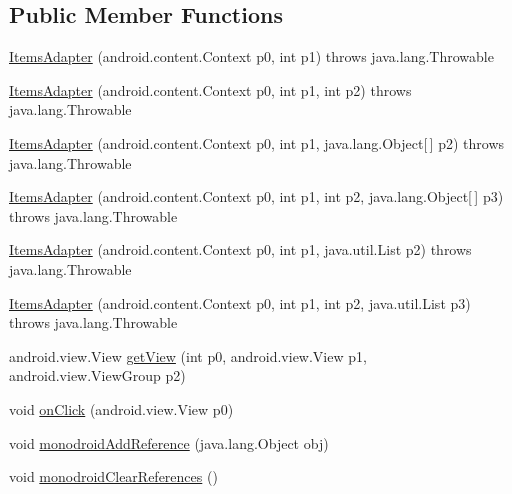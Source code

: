 \subsection*{Public Member Functions}
\begin{DoxyCompactItemize}
\item 
\hyperlink{classfieldservice_1_1android_1_1_items_adapter_abb087f5fb49c5ccf5af17468f4df7815}{Items\+Adapter} (android.\+content.\+Context p0, int p1)  throws java.\+lang.\+Throwable 	
\item 
\hyperlink{classfieldservice_1_1android_1_1_items_adapter_a055b38fb61fbe618b0c95b8e145b3b0f}{Items\+Adapter} (android.\+content.\+Context p0, int p1, int p2)  throws java.\+lang.\+Throwable 	
\item 
\hyperlink{classfieldservice_1_1android_1_1_items_adapter_aed254b3c42d9dd74b3f49d5d9498c1c1}{Items\+Adapter} (android.\+content.\+Context p0, int p1, java.\+lang.\+Object\mbox{[}$\,$\mbox{]} p2)  throws java.\+lang.\+Throwable 	
\item 
\hyperlink{classfieldservice_1_1android_1_1_items_adapter_a82b683382d9cf2aaebb3b0bc3e5a78ea}{Items\+Adapter} (android.\+content.\+Context p0, int p1, int p2, java.\+lang.\+Object\mbox{[}$\,$\mbox{]} p3)  throws java.\+lang.\+Throwable 	
\item 
\hyperlink{classfieldservice_1_1android_1_1_items_adapter_aadb0f6b25910fd53668695e561333258}{Items\+Adapter} (android.\+content.\+Context p0, int p1, java.\+util.\+List p2)  throws java.\+lang.\+Throwable 	
\item 
\hyperlink{classfieldservice_1_1android_1_1_items_adapter_a3bbc96534ea6b63aaa6facbbada830d8}{Items\+Adapter} (android.\+content.\+Context p0, int p1, int p2, java.\+util.\+List p3)  throws java.\+lang.\+Throwable 	
\item 
android.\+view.\+View \hyperlink{classfieldservice_1_1android_1_1_items_adapter_af4741596fa35aa36314a15281c548047}{get\+View} (int p0, android.\+view.\+View p1, android.\+view.\+View\+Group p2)
\item 
void \hyperlink{classfieldservice_1_1android_1_1_items_adapter_a6e23c650496482215287698a23696d89}{on\+Click} (android.\+view.\+View p0)
\item 
void \hyperlink{classfieldservice_1_1android_1_1_items_adapter_a93bc2bb739c81dc40014150bf7f95e6e}{monodroid\+Add\+Reference} (java.\+lang.\+Object obj)
\item 
void \hyperlink{classfieldservice_1_1android_1_1_items_adapter_adc9580432b06e2b6c404839167e52ae5}{monodroid\+Clear\+References} ()
\end{DoxyCompactItemize}


